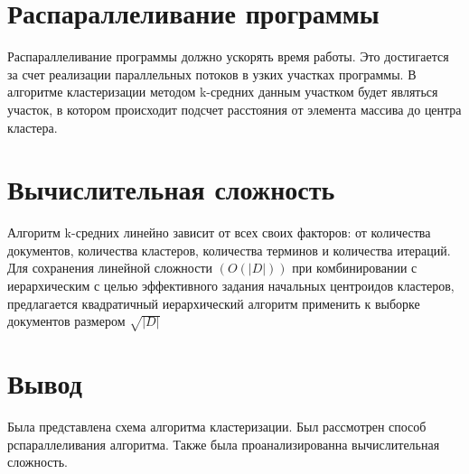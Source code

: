\section{Распараллеливание программы}

Распараллеливание программы должно ускорять время работы. 
Это достигается за счет реализации параллельных потоков в узких участках программы.
В алгоритме кластеризации методом k-средних данным участком будет являться участок, в котором происходит подсчет расстояния от элемента массива до центра кластера.



\section{Вычислительная сложность}

Алгоритм k-средних линейно зависит от всех своих факторов: от количества документов, количества кластеров, количества
терминов и количества итераций. 
Для сохранения линейной сложности  $(O(|D|))$  при  комбинировании с иерархическим с целью эффективного задания начальных
центроидов кластеров, предлагается квадратичный иерархический алгоритм
применить к выборке документов размером $\sqrt{|D|}$






\section{Вывод}

Была представлена схема алгоритма кластеризации. Был рассмотрен способ рспараллеливания алгоритма. Также была проанализированна вычислительная сложность.
